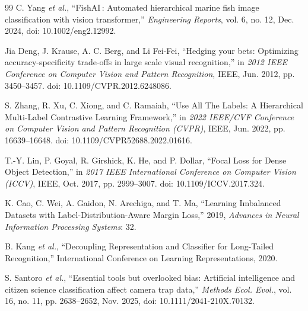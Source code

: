 \documentclass[preprint,12pt]{elsarticle}
\begin{document}
\begin{thebibliography}{99}
 C. Yang \emph{et al.}, ``FishAI\,: Automated hierarchical
marine fish image classification with vision transformer,''
\emph{Engineering Reports}, vol. 6, no. 12, Dec. 2024, doi:
10.1002/eng2.12992.

 Jia Deng, J. Krause, A. C. Berg, and Li Fei-Fei, ``Hedging your
bets: Optimizing accuracy-specificity trade-offs in large scale visual
recognition,'' in \emph{2012 IEEE Conference on Computer Vision and
Pattern Recognition}, IEEE, Jun. 2012, pp. 3450--3457. doi:
10.1109/CVPR.2012.6248086.

 S. Zhang, R. Xu, C. Xiong, and C. Ramaiah, ``Use All The
Labels: A Hierarchical Multi-Label Contrastive Learning Framework,'' in
\emph{2022 IEEE/CVF Conference on Computer Vision and Pattern
Recognition (CVPR)}, IEEE, Jun. 2022, pp. 16639--16648. doi:
10.1109/CVPR52688.2022.01616.

 T.-Y. Lin, P. Goyal, R. Girshick, K. He, and P. Dollar, ``Focal
Loss for Dense Object Detection,'' in \emph{2017 IEEE International
Conference on Computer Vision (ICCV)}, IEEE, Oct. 2017, pp. 2999--3007.
doi: 10.1109/ICCV.2017.324.

 K. Cao, C. Wei, A. Gaidon, N. Arechiga, and T. Ma, ``Learning
Imbalanced Datasets with Label-Distribution-Aware Margin Loss,'' 2019,
\emph{Advances in Neural Information Processing Systems}: 32.

 B. Kang \emph{et al.}, ``Decoupling Representation and
Classifier for Long-Tailed Recognition,'' International Conference on
Learning Representations, 2020.

 S. Santoro \emph{et al.}, ``Essential tools but overlooked
bias: Artificial intelligence and citizen science classification affect
camera trap data,'' \emph{Methods Ecol. Evol.}, vol. 16, no. 11, pp.
2638--2652, Nov. 2025, doi: 10.1111/2041-210X.70132.

\end{thebibliography}
\end{document}
